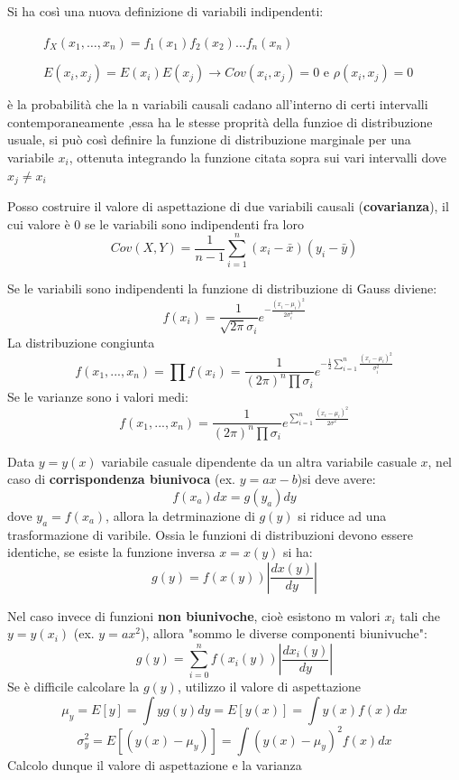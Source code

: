 \documentclass{article}
\theoremstyle{remark}
\begin{document}
Si ha così una nuova definizione di variabili indipendenti:
\begin{description}
    \item[] $f_X(x_1, \ldots, x_n) = f_1(x_1)f_2(x_2)\ldots f_n(x_n)$
    \item[] $E(x_i,x_j)=E(x_i)E(x_j) \rightarrow Cov(x_i,x_j)=0$ e $\rho(x_i,x_j)=0$
\end{description}

è la probabilità che la n variabili causali cadano all'interno  di certi intervalli contemporaneamente
,essa ha le stesse proprità della funzioe di distribuzione usuale, si può così definire la funzione di distribuzione marginale per una variabile $x_i$, ottenuta integrando
la funzione citata sopra sui vari intervalli dove $x_j\neq x_i$

Posso costruire il valore di aspettazione di due variabili causali (\textbf{covarianza}), il cui valore è 0 se le variabili sono indipendenti fra loro
\[
Cov (X, Y) = \frac{1}{n - 1} \sum_{i=1}^{n} (x_i - \bar{x})(y_i - \bar{y})
\]



Se le variabili sono indipendenti la funzione di distribuzione di Gauss diviene:
\[
f(x_i)=\frac{1}{\sqrt{2\pi}\sigma_i}e^{-\frac{(x_i-\mu_i)^2}{2\sigma_i^2}}
\]
La distribuzione congiunta
\[
f(x_1, ..., x_n)=\prod f(x_i) = \frac{1}{(2\pi)^n \prod \sigma_i} e^{-\frac{1}{2} \sum_{i=1}^{n} \frac{(x_i-\mu_i)^2}{\sigma_i^2}}
\]
Se le varianze sono i valori medi:
\[
f(x_1, ..., x_n)=\frac{1}{(2\pi)^n \prod \sigma_i} e^{ \sum_{i=1}^{n} \frac{(x_i-\mu_i)^2}{2\sigma^2}}
\]

Data $y=y(x)$ variabile casuale dipendente da un altra variabile casuale $x$, nel caso di \textbf{corrispondenza biunivoca} (ex. $y=ax -b$)si deve avere:
\[
f(x_a)dx=g(y_a)dy
\]
dove $y_a=f(x_a)$, allora la detrminazione di $g(y)$ si riduce ad una trasformazione di varibile. 
Ossia le funzioni di distribuzioni devono essere identiche, se esiste la funzione inversa $x=x(y)$ si ha: 
\[
g(y)=f(x(y))\left|\frac{dx(y)}{dy}\right|
\]

Nel caso invece di funzioni \textbf{non biunivoche}, cioè esistono m valori $x_i$ tali che $y=y(x_i)$ (ex. $y=ax^2$), allora "sommo le diverse componenti biunivuche":
\[
    g(y)=\sum_{i=0}^{n}f(x_i(y))\left|\frac{dx_i(y)}{dy}\right|
\]
Se è difficile calcolare la $g(y)$, utilizzo il valore di aspettazione
\[
\mu_y = E[y]=\int yg(y)dy= E[y(x)] =\int y(x)f(x)dx
\]
\[
\sigma_y^2=E[(y(x)-\mu_y)]= \int (y(x)-\mu_y)^2f(x)dx
\]
Calcolo dunque il valore di aspettazione e la varianza
\end{document}
